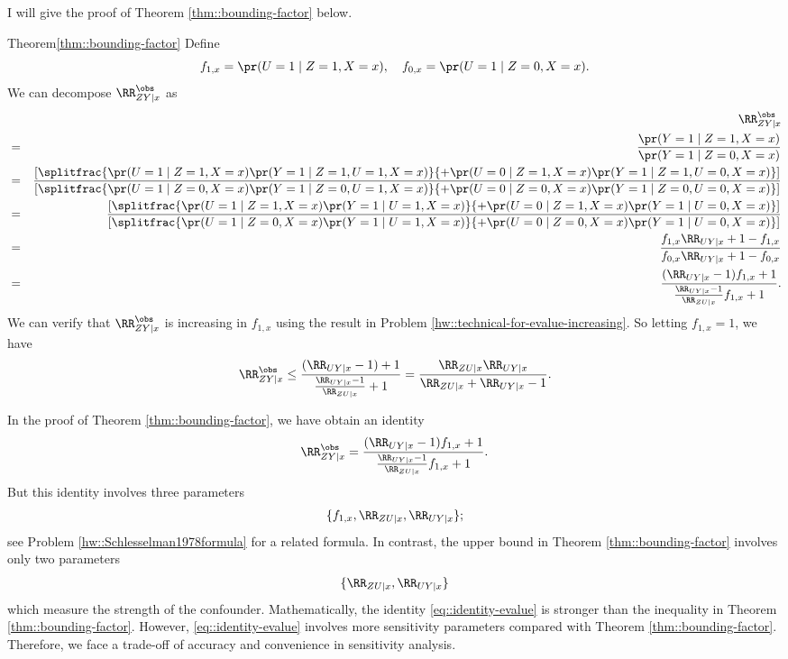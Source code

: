 I will give the proof of Theorem \ref{thm::bounding-factor}  below. 


\begin{myproof}{Theorem}{\ref{thm::bounding-factor}}
Define 
$$ 
f_{1,x} = \pr(U=1\mid Z=1,X=x),\quad
f_{0,x}  = \pr(U=1\mid Z=0,X=x) .
$$ 
We can decompose $\RR_{ZY\mid x}^\obs$ as
\begin{eqnarray*}
&&\RR_{ZY\mid x}^\obs  \\
&=& \frac{  \pr( Y  = 1\mid Z=1, X=x  ) }{ \pr( Y  = 1\mid  Z=0,  X=x  ) } \\
&=& \frac{ \left[ \splitfrac{ \pr(U=1\mid Z=1,  X=x) \pr( Y  = 1\mid Z=1, U=1,  X=x  ) }{+ \pr(U=0\mid Z=1,  X=x) \pr( Y  = 1\mid Z=1, U=0,  X=x  )} \right]}
{ \left[ \splitfrac{\pr(U=1\mid Z=0,  X=x) \pr( Y  = 1\mid  Z=0, U=1,  X=x  )}{  +  \pr(U=0\mid Z=0,  X=x) \pr( Y  = 1\mid  Z=0, U=0,  X=x  ) } \right]  } \\
&=& \frac{ \left[ \splitfrac{ \pr(U=1\mid Z=1,  X=x) \pr( Y  = 1\mid U=1,  X=x  ) }{+ \pr(U=0\mid Z=1,  X=x) \pr( Y  = 1\mid U=0,  X=x  )}\right] }
{  \left[ \splitfrac{ \pr(U=1\mid Z=0,  X=x) \pr( Y  = 1\mid   U=1,  X=x  )  }{+  \pr(U=0\mid Z=0,  X=x) \pr( Y  = 1\mid  U=0,  X=x  ) }\right]  } \\
&=& \frac{  f_{1,x} \RR_{UY\mid x} + 1- f_{1,x}  }{ f_{0,x} \RR_{UY\mid x} + 1- f_{0,x}  } \\
&=& \frac{  (\RR_{UY\mid x} - 1) f_{1,x} + 1  }{      \frac{  \RR_{UY\mid x} - 1}{  \RR_{ZU\mid x} }    f_{1,x} + 1  } .
\end{eqnarray*}
We can verify that $\RR_{ZY\mid x}^\obs$ is increasing in $f_{1,x} $ using the result in Problem \ref{hw::technical-for-evalue-increasing}. So letting $f_{1,x} = 1$, we have
$$
\RR_{ZY\mid x}^\obs \leq \frac{  (\RR_{UY\mid x} - 1) + 1  }{      \frac{  \RR_{UY\mid x} - 1}{  \RR_{ZU\mid x} }    + 1  }
= \frac{ \RR_{ZU\mid x}  \RR_{UY\mid x} }{  \RR_{ZU\mid x} + \RR_{UY\mid x} - 1} .
$$
\end{myproof}

In the proof of Theorem \ref{thm::bounding-factor}, we have obtain an identity
\begin{equation}
\label{eq::identity-evalue}
\RR_{ZY\mid x}^\obs = \frac{  (\RR_{UY\mid x} - 1) f_{1,x} + 1  }{      \frac{  \RR_{UY\mid x} - 1}{  \RR_{ZU\mid x} }    f_{1,x} + 1  } .
\end{equation}
But this identity involves three parameters 
$$
\{  f_{1,x}, \RR_{ZU\mid x},  \RR_{UY\mid x}  \} ;
$$
see Problem \ref{hw::Schlesselman1978formula} for a related formula. In contrast, the upper bound in Theorem \ref{thm::bounding-factor} involves only two parameters 
$$
\{  \RR_{ZU\mid x},  \RR_{UY\mid x}  \}
 $$
 which measure the strength of the confounder.
 Mathematically, the identity \ref{eq::identity-evalue} is stronger than the inequality in Theorem \ref{thm::bounding-factor}. However, \ref{eq::identity-evalue}  involves more sensitivity parameters compared with Theorem \ref{thm::bounding-factor}. Therefore, we face a trade-off of accuracy and convenience in sensitivity analysis.


